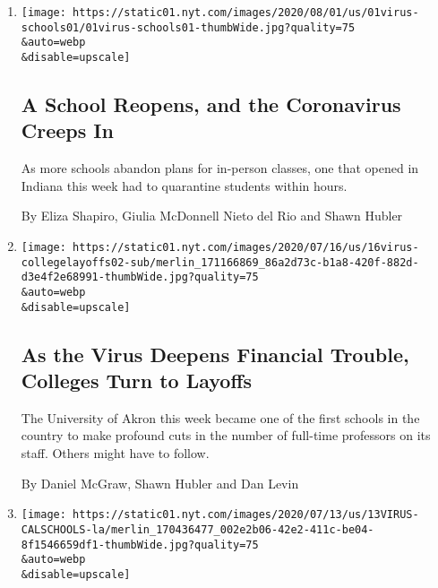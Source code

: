 \begin{enumerate}
\def\labelenumi{\arabic{enumi}.}
\item
  \href{/2020/08/01/us/schools-reopening-indiana-coronavirus.html}{}

  \texttt{[image: https://static01.nyt.com/images/2020/08/01/us/01virus-schools01/01virus-schools01-thumbWide.jpg?quality=75\\\&auto=webp\\\&disable=upscale]}

  \hypertarget{a-school-reopens-and-the-coronavirus-creeps-in}{%
  \subsection{A School Reopens, and the Coronavirus Creeps
  In}\label{a-school-reopens-and-the-coronavirus-creeps-in}}

  As more schools abandon plans for in-person classes, one that opened
  in Indiana this week had to quarantine students within hours.

  By Eliza Shapiro, Giulia McDonnell Nieto del Rio and Shawn Hubler
\item
  \href{/2020/07/16/us/coronavirus-college-faculty-layoffs.html}{}

  \texttt{[image: https://static01.nyt.com/images/2020/07/16/us/16virus-collegelayoffs02-sub/merlin\_171166869\_86a2d73c-b1a8-420f-882d-d3e4f2e68991-thumbWide.jpg?quality=75\\\&auto=webp\\\&disable=upscale]}

  \hypertarget{as-the-virus-deepens-financial-trouble-colleges-turn-to-layoffs}{%
  \subsection{As the Virus Deepens Financial Trouble, Colleges Turn to
  Layoffs}\label{as-the-virus-deepens-financial-trouble-colleges-turn-to-layoffs}}

  The University of Akron this week became one of the first schools in
  the country to make profound cuts in the number of full-time
  professors on its staff. Others might have to follow.

  By Daniel McGraw, Shawn Hubler and Dan Levin
\item
  \href{/2020/07/13/us/lausd-san-diego-school-reopening.html}{}

  \texttt{[image: https://static01.nyt.com/images/2020/07/13/us/13VIRUS-CALSCHOOLS-la/merlin\_170436477\_002e2b06-42e2-411c-be04-8f1546659df1-thumbWide.jpg?quality=75\\\&auto=webp\\\&disable=upscale]}

  \hypertarget{los-angeles-and-san-diego-schools-to-go-online-only-in-the-fall}{%
}
\end{enumerate}
